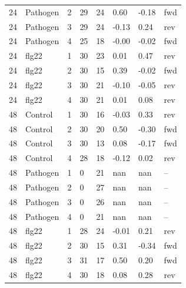 \begin{table}[ht]
\begin{tabular}{llllllll}
24 & Pathogen & 2 & 29 & 24 & 0.60 & -0.18 & fwd \\
24 & Pathogen & 3 & 29 & 24 & -0.13 & 0.24 & rev \\
24 & Pathogen & 4 & 25 & 18 & -0.00 & -0.02 & fwd \\
24 & flg22 & 1 & 30 & 23 & 0.01 & 0.47 & rev \\
24 & flg22 & 2 & 30 & 15 & 0.39 & -0.02 & fwd \\
24 & flg22 & 3 & 30 & 21 & -0.10 & -0.05 & rev \\
24 & flg22 & 4 & 30 & 21 & 0.01 & 0.08 & rev \\
48 & Control & 1 & 30 & 16 & -0.03 & 0.33 & rev \\
48 & Control & 2 & 30 & 20 & 0.50 & -0.30 & fwd \\
48 & Control & 3 & 30 & 13 & 0.08 & -0.17 & fwd \\
48 & Control & 4 & 28 & 18 & -0.12 & 0.02 & rev \\
48 & Pathogen & 1 & 0 & 21 & nan & nan & -- \\
48 & Pathogen & 2 & 0 & 27 & nan & nan & -- \\
48 & Pathogen & 3 & 0 & 26 & nan & nan & -- \\
48 & Pathogen & 4 & 0 & 21 & nan & nan & -- \\
48 & flg22 & 1 & 28 & 24 & -0.01 & 0.21 & rev \\
48 & flg22 & 2 & 30 & 15 & 0.31 & -0.34 & fwd \\
48 & flg22 & 3 & 31 & 17 & 0.50 & 0.20 & fwd \\
48 & flg22 & 4 & 30 & 18 & 0.08 & 0.28 & rev \\
\bottomrule
\end{tabular}
\end{table}
